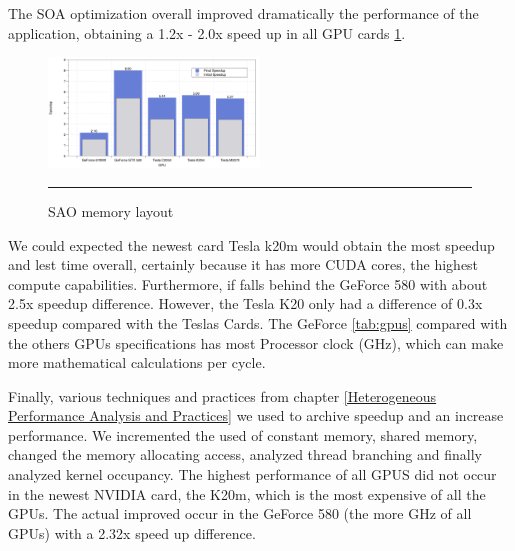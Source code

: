 The SOA optimization overall improved dramatically the performance of the application, obtaining a 1.2x - 2.0x speed up in all GPU cards \ref{fig:speedup}.

\begin{figure}[htbp]
	\centering
		\includegraphics[width=0.5\textwidth]{Figures/speed.png}
		\rule{35em}{0.2pt}
	\caption[Structure of Arrays (SAO)]{SAO memory layout}
	\label{fig:speedup}
\end{figure}


We could expected the newest card Tesla k20m would obtain the most speedup and lest time overall,  certainly because it has more CUDA cores, the highest compute capabilities. Furthermore, if falls behind the GeForce 580 with about 2.5x speedup difference. However, the Tesla K20 only had a difference of 0.3x speedup compared with the Teslas Cards. The GeForce \ref{tab:gpus} compared with the others GPUs specifications has most Processor clock (GHz), which can make more mathematical calculations per cycle.

  \vspace{3.5em}

Finally, various techniques and practices from chapter \ref{Heterogeneous Performance Analysis and Practices} we used to archive speedup and an increase performance. We incremented the used of constant memory, shared memory, changed the memory allocating access, analyzed thread branching and finally analyzed kernel occupancy. The highest performance of all GPUS did not occur in the newest NVIDIA card, the K20m, which is the most expensive of all the GPUs. The actual improved occur in the GeForce 580 (the more GHz of all GPUs) with a 2.32x speed up difference.
  
